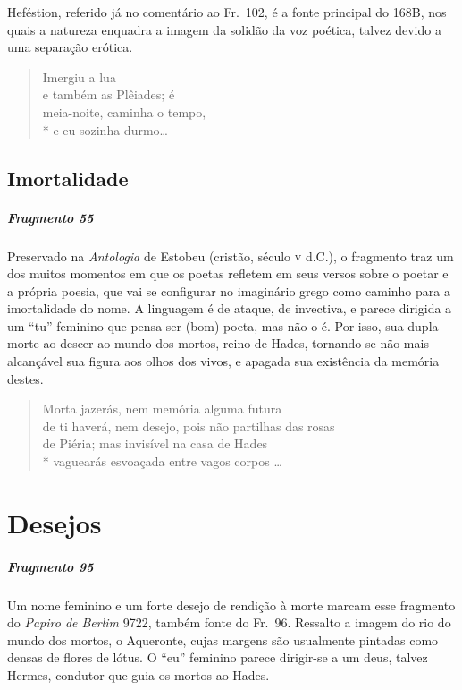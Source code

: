 {\small Heféstion, referido já no comentário ao Fr.~102, é a fonte principal do 168B,
nos quais a natureza enquadra a imagem da solidão da voz poética, talvez devido
a uma separação erótica.}

\begin{verse}
Imergiu a lua\\
e também as Plêiades; é\\
meia-noite, caminha o tempo,\\*
e eu sozinha durmo\ldots{}
\end{verse}

\section{Imortalidade}

\paragraph{Fragmento 55}

{\small Preservado na \textit{Antologia }de Estobeu (cristão, século \textsc{v} d.C.), o
fragmento traz um dos muitos momentos em que os poetas refletem em seus versos
sobre o poetar e a própria poesia, que vai se configurar no imaginário grego
como caminho para a imortalidade do nome. A linguagem é de ataque, de
invectiva, e parece dirigida a um “tu” feminino que pensa ser (bom) poeta, mas
não o é. Por isso, sua dupla morte ao descer ao mundo dos mortos, reino de
Hades, tornando-se não mais alcançável sua figura aos olhos dos vivos, e
apagada sua existência da memória destes.}

\begin{verse}
Morta jazerás, nem memória alguma futura\\
de ti haverá, nem desejo, pois não partilhas das \qb{}rosas\\
de Piéria; mas invisível na casa de Hades\\*
vaguearás esvoaçada entre vagos corpos \ldots{}
\end{verse}


\chapter{Desejos}

\paragraph{Fragmento 95}

{\small Um nome feminino e um forte desejo de rendição à morte marcam esse fragmento do
\textit{Papiro de Berlim }9722, também fonte do Fr.~96. Ressalto a imagem do
rio do mundo dos mortos, o Aqueronte, cujas margens são usualmente pintadas
como densas de flores de lótus. O “eu” feminino parece dirigir-se a um deus,
talvez Hermes, condutor que guia os mortos ao Hades.}

